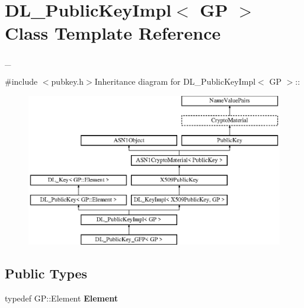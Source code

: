 \hypertarget{class_d_l___public_key_impl}{
\section{DL\_\-PublicKeyImpl$<$ GP $>$ Class Template Reference}
\label{class_d_l___public_key_impl}
}


\_\-  


{\ttfamily \#include $<$pubkey.h$>$}Inheritance diagram for DL\_\-PublicKeyImpl$<$ GP $>$::\begin{figure}[H]
\begin{center}
\leavevmode
\includegraphics[height=6.66667cm]{class_d_l___public_key_impl}
\end{center}
\end{figure}
\subsection*{Public Types}
\begin{DoxyCompactItemize}
\item 
\hypertarget{class_d_l___public_key_impl_a78f2e62a746f8a54b57b18df988598a8}{
typedef GP::Element {\bfseries Element}}
\label{class_d_l___public_key_impl_a78f2e62a746f8a54b57b18df988598a8}

\end{DoxyCompactItemize}
